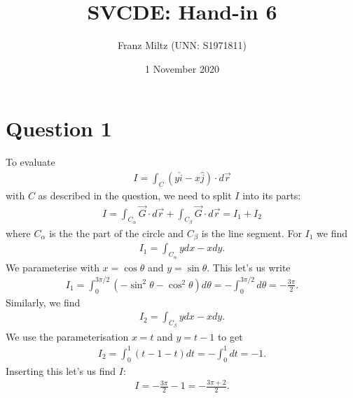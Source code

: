 \documentclass{article}
\newcommand{\ih}{\widehat i}
\newcommand{\jh}{\widehat j}
\begin{document}
\title{SVCDE: Hand-in 6}
\author{Franz Miltz (UNN: S1971811)}
\date{1 November 2020}
\maketitle
\section*{Question 1}
To evaluate
\begin{align*}
  I=\int_C \left(y\ih - x\jh\right)\cdot d\vec r 
\end{align*}
with $C$ as described in the question, we need to split $I$ into its 
parts:
\begin{align*}
  I = \int_{C_\alpha} \vec G \cdot d\vec r + \int_{C_\beta} \vec G \cdot d\vec r = I_1 + I_2
\end{align*}
where $C_\alpha$ is the the part of the circle and $C_\beta$ is the line segment.
For $I_1$ we find
\begin{align*}
  I_1 = \int_{C_\alpha} ydx-xdy.
\end{align*}
We parameterise with $x=\cos\theta$ and $y=\sin\theta$.
This let's us write
\begin{align*}
  I_1 = \int_0^{3\pi/2} \left(-\sin^2\theta - \cos^2\theta\right) d\theta
  =-\int_0^{3\pi/2}d\theta=-\frac{3\pi}{2}.
\end{align*}
Similarly, we find
\begin{align*}
  I_2 = \int_{C_\beta} ydx-xdy.
\end{align*}
We use the parameterisation $x=t$ and $y=t-1$ to get
\begin{align*}
  I_2 = \int_0^1 (t-1-t)dt=-\int_0^1 dt = -1.
\end{align*}
Inserting this let's us find $I$:
\begin{align*}
  I = -\frac{3\pi}{2}-1 = -\frac{3\pi + 2}{2}.
\end{align*}
\end{document}
